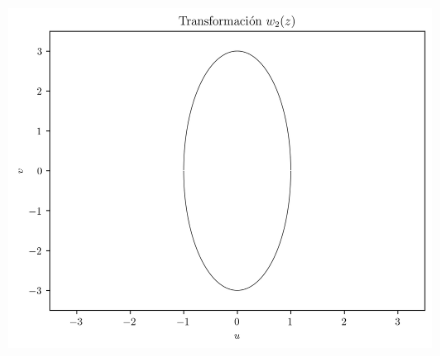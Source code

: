 \begin{enumerate}
    \begin{figure}[h]
        \centering
        \includegraphics{imgs/w2.png}        
    \end{figure}
\end{enumerate}